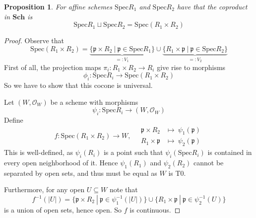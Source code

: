 \documentclass{scrartcl}
\newcommand{\p}{\mathfrak{p}}
\newcommand{\Sch}{\mathrm{\textbf{Sch}}}
\newcommand{\Spec}{\mathrm{Spec}}
\renewcommand{\O}{\mathcal{O}}
\newtheorem{prop}{Proposition}[section]
\theoremstyle{definition}
\begin{document}
\begin{prop}
    For affine schemes $\Spec R_1$ and $\Spec R_2$ have that the coproduct in $\Sch$ is
    \begin{equation*}
        \Spec R_1 \sqcup \Spec R_2 = \Spec(R_1 \times R_2)
    \end{equation*}
\end{prop}
\begin{proof}
    Observe that
    \begin{equation*}
        \Spec(R_1 \times R_2) = \underbrace{\{ \p \times R_2 \ | \ \p \in \Spec R_1 \}}_{=: V_1} \cup \underbrace{\{ R_1 \times \p \ | \ \p \in \Spec R_2 \}}_{=: V_2}
    \end{equation*}
    First of all, the projection maps $\pi_i: R_1 \times R_2 \to R_i$ give rise to morphisms
    \begin{equation*}
        \phi_i: \Spec R_i \to \Spec(R_1 \times R_2)
    \end{equation*}
    So we have to show that this cocone is universal.

    Let $(W, \O_W)$ be a scheme with morphisms
    \begin{equation*}
        \psi_i: \Spec R_i \to (W, \O_W)
    \end{equation*}
    Define
    \begin{equation*}
        f: \Spec(R_1 \times R_2) \to W, \quad \begin{matrix*}
            \p \times R_2 &\mapsto\ \psi_1(\p) \\
            R_1 \times \p &\mapsto\ \psi_2(\p)
        \end{matrix*}
    \end{equation*}
    This is well-defined, as $\psi_i(R_i)$ is a point such that $\psi_i(\Spec R_i)$ is contained in every open neighborhood of it.
    Hence $\psi_1(R_1)$ and $\psi_2(R_2)$ cannot be separated by open sets, and thus must be equal as $W$ is T0.

    Furthermore, for any open $U \subseteq W$ note that
    \begin{equation*}
        f^{-1}(|U|) = \{ \p \times R_2 \ | \ \p \in \psi_1^{-1}(|U|) \} \cup \{ R_1 \times \p \ | \ \p \in \psi_2^{-1}(U) \}
    \end{equation*}
    is a union of open sets, hence open.
    So $f$ is continuous.


\end{proof}
\end{document}
